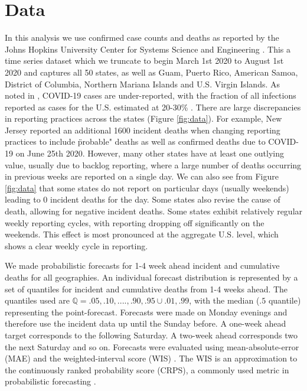 \documentclass[11pt]{amsart}
\begin{document}
\section{Data}
	In this analysis we use confirmed case counts and deaths as reported by the Johns Hopkins University Center for Systems Science and Engineering \cite{dong2020interactive}. This a time series dataset which we truncate to begin March 1st 2020 to August 1st 2020 and captures all 50 states, as well as Guam, Puerto Rico, American Samoa, District of Columbia, Northern Mariana Islands and U.S. Virgin Islands. As noted in \cite{krantz2020level}, COVID-19 cases are under-reported, with the fraction of all infections reported as cases for the U.S. estimated at 20-30\% \cite{russel2020using}. 
	There are large discrepancies in reporting practices across the states (Figure \ref{fig:data}). For example, New Jersey reported an additional 1600 incident deaths when changing reporting practices to include \"probable" deaths as well as confirmed deaths due to COVID-19 on June 25th 2020. However, many other states have at least one outlying value, usually due to backlog reporting, where a large number of deaths occurring in previous weeks are reported on a single day. We can also see from Figure \ref{fig:data} that some states do not report on particular days (usually weekends) leading to 0 incident deaths for the day. Some states also revise the cause of death, allowing for negative incident deaths.  Some states exhibit relatively regular weekly reporting cycles, with reporting dropping off significantly on the weekends. This effect is most pronounced at the aggregate U.S. level, which shows a clear weekly cycle in reporting. 
	
	
We made probabilistic forecasts  for 1-4 week ahead incident and cumulative deaths for all geographies. An individual forecast distribution is represented by a set of quantiles for incident and cumulative deaths from 1-4 weeks ahead. The quantiles used are $\mathbb{Q} = {.05,.10,....,.90,.95} \cup {.01,.99}$, with the median ($.5$ quantile) representing the point-forecast. Forecasts were made on Monday evenings and therefore use the incident data up until the Sunday before. A one-week ahead target corresponds to the following Saturday. A two-week ahead corresponds two the next Saturday and so on. Forecasts were evaluated using mean-absolute-error (MAE) and the weighted-interval score (WIS) \cite{bracher2020evaluating}. The WIS is an approximation to the continuously ranked probability score (CRPS), a commonly used metric in probabilistic forecasting \cite{bracher2019multibin}\cite{reich2019reply}.
\end{document}
